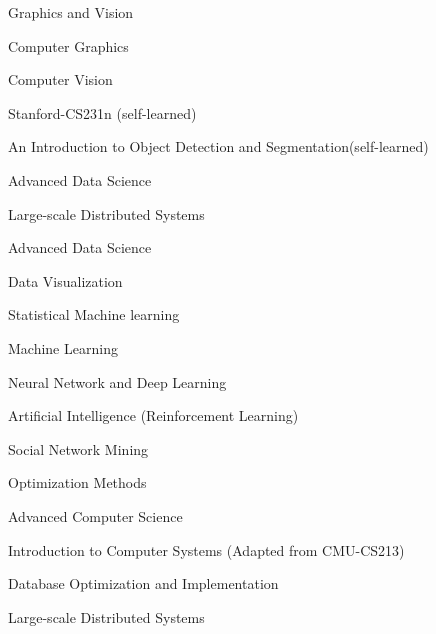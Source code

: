 
\begin{cventries}
\cventry
  {Graphics and Vision} %
  {} %
  {} %
  {} %
  {
    \begin{cvitems} %
      \item {Computer Graphics}
      \item {Computer Vision}
      \item {Stanford-CS231n (self-learned)}
      \item {An Introduction to Object Detection and Segmentation(self-learned)}
    \end{cvitems}
  }

\cventry
  {Advanced Data Science} %
  {} %
  {} %
  {} %
  {
    \begin{cvitems} %
      \item {Large-scale Distributed Systems}
      \item {Advanced Data Science}
      \item {Data Visualization}
      \item {Statistical Machine learning}
    \end{cvitems}
  }

\cventry
  {Machine Learning} %
  {} %
  {} %
  {} %
  {
    \begin{cvitems} %
      \item {Neural Network and Deep Learning}
      \item {Artificial Intelligence (Reinforcement Learning)}
      \item {Social Network Mining}
      \item {Optimization Methods}
    \end{cvitems}
  }

\cventry
  {Advanced Computer Science} %
  {} %
  {} %
  {} %
  {
    \begin{cvitems} %
      \item {Introduction to Computer Systems (Adapted from CMU-CS213)}
      \item {Database Optimization and Implementation}
      \item {Large-scale Distributed Systems}
    \end{cvitems}
  }


\end{cventries}
